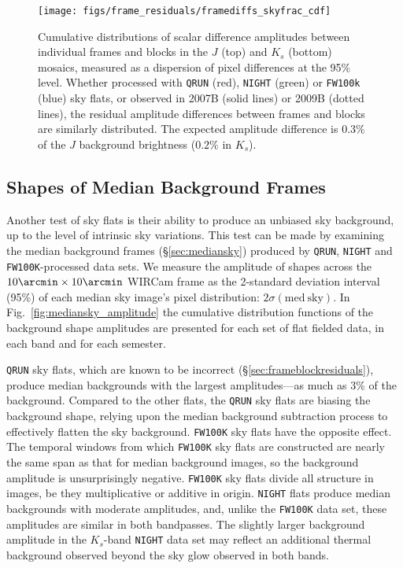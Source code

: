 \documentclass[iop]{emulateapj}
\newcommand{\mycomment}[1]{\textcolor{OliveGreen}{\textit{#1}}} %
\newcommand{\Fig}[1]{Fig.~\ref{fig:#1}}  %
\newcommand{\Sec}[1]{\S\ref{sec:#1}}  %
\begin{document}
\begin{figure}[t]
\centering
\texttt{[image: figs/frame\_residuals/framediffs\_skyfrac\_cdf]}
\caption{Cumulative distributions of scalar difference amplitudes between individual frames and blocks in the $J$ (top) and $K_s$ (bottom) mosaics, measured as a dispersion of pixel differences at the 95\% level.
  Whether processed with \texttt{QRUN} (red), \texttt{NIGHT} (green) or \texttt{FW100k} (blue) sky flats, or observed in 2007B (solid lines) or 2009B (dotted lines), the residual amplitude differences between frames and blocks are similarly distributed.
The expected amplitude difference is $0.3\%$ of the $J$ background brightness ($0.2\%$ in $K_s$).
}
\label{fig:frame_diffs_skyfrac}
\end{figure}


\subsection{Shapes of Median Background Frames}
\label{sec:medianskyshapes}

Another test of sky flats is their ability to produce an unbiased sky background, up to the level of intrinsic sky variations.
This test can be made by examining the median background frames (\Sec{mediansky}) produced by \texttt{QRUN}, \texttt{NIGHT} and \texttt{FW100K}-processed data sets.
We measure the amplitude of shapes across the $10\arcmin \times 10\arcmin$ WIRCam frame as the 2-standard deviation interval (95\%) of each median sky image's pixel distribution: $2 \sigma(\mathrm{med~sky})$.
In \Fig{mediansky_amplitude} the cumulative distribution functions of the background shape amplitudes are presented for each set of flat fielded data, in each band and for each semester.

\texttt{QRUN} sky flats, which are known to be incorrect (\Sec{frameblockresiduals}), produce median backgrounds with the largest amplitudes---as much as 3\% of the background.
Compared to the other flats, the \texttt{QRUN} sky flats are biasing the background shape, relying upon the median background subtraction process to effectively flatten the sky background.
\texttt{FW100K} sky flats have the opposite effect.
The temporal windows from which \texttt{FW100K} sky flats are constructed are nearly the same span as that for median background images, so the background amplitude is unsurprisingly negative.
\texttt{FW100K} sky flats divide all structure in images, be they multiplicative or additive in origin.
\texttt{NIGHT} flats produce median backgrounds with moderate amplitudes, and, unlike the \texttt{FW100K} data set, these amplitudes are similar in both bandpasses.
The slightly larger background amplitude in the $K_s$-band \texttt{NIGHT} data set may reflect an additional thermal background observed beyond the sky glow observed in both bands.
\end{document}
